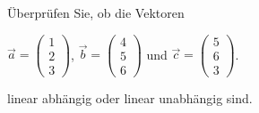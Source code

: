 \begin{ExerciseBlock}
Überprüfen Sie, ob die Vektoren 
\begin{center} 
$ \vec{a}=\left(\begin{array}{c} 1 \\ 2 \\ 3 \end{array}\right)$, 
$\vec{b}=\left(\begin{array}{c} 4 \\ 5 \\ 6 \end{array}\right)$ und ${\vec{c}}=\left(\begin{array}{c} 5 \\ 6 \\ 3 \end{array}\right)$. 
\end{center}
linear abhängig oder linear unabhängig sind.

\end{ExerciseBlock}
